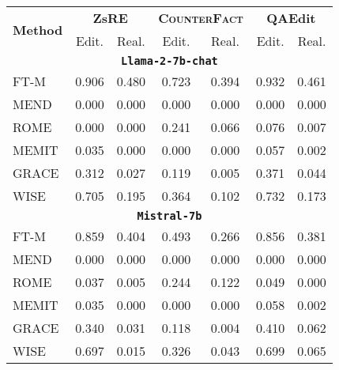 \begin{table}[t]
    \centering
    \begin{adjustbox}{max width=\linewidth}
    \begin{tabular}{lcc cc cc}
    \toprule
    \multirow{2}{*}{\textbf{Method}} & \multicolumn{2}{c}{\textbf{ZsRE}} & \multicolumn{2}{c}{\textbf{\textsc{CounterFact}}} & \multicolumn{2}{c}{\textbf{QAEdit}} \\
    
     \cmidrule(lr){2-3} \cmidrule(lr){4-6} \cmidrule(lr){6-7} 
     & Edit. & Real.  & Edit. & Real. & Edit.  & Real. \\
     \midrule
     \multicolumn{7}{c}{\texttt{\textbf{Llama-2-7b-chat}}} \\
     \midrule
    FT-M & \num{0.906} & \num{0.480} & \num{0.723} & \num{0.394} & \num{0.932}   & \num{0.461} \\
    MEND & \num{0.000} & \num{0.000} & \num{0.000} & \num{0.000} & \num{0.000}   & \num{0.000} \\
    ROME & \num{0.000} & \num{0.000} & \num{0.241} & \num{0.066} & \num{0.076}   & \num{0.007} \\
    MEMIT & \num{0.035} & \num{0.000} & \num{0.000} & \num{0.000} & \num{0.057}   & \num{0.002} \\
    GRACE & \num{0.312} & \num{0.027} & \num{0.119} & \num{0.005} & \num{0.371}   & \num{0.044} \\
    WISE & \num{0.705} & \num{0.195} & \num{0.364} & \num{0.102} & \num{0.732}   & \num{0.173} \\
    
    \midrule
     
    \multicolumn{7}{c}{\texttt{\textbf{Mistral-7b}}} \\
    \midrule
    FT-M & \num{0.859} & \num{0.404} & \num{0.493} & \num{0.266} & \num{0.856}   & \num{0.381} \\
    MEND & \num{0.000} & \num{0.000} & \num{0.000} & \num{0.000} & \num{0.000}   & \num{0.000} \\
    ROME & \num{0.037} & \num{0.005} & \num{0.244} & \num{0.122} & \num{0.049}   & \num{0.000} \\
    MEMIT & \num{0.035} & \num{0.000} & \num{0.000} & \num{0.000} & \num{0.058}   & \num{0.002} \\
    GRACE & \num{0.340} & \num{0.031} & \num{0.118} & \num{0.004} & \num{0.410}   & \num{0.062} \\
    WISE & \num{0.697} & \num{0.015} & \num{0.326} & \num{0.043} & \num{0.699}   & \num{0.065} \\
    \midrule


\end{tabular}
\end{adjustbox}
\end{table}
